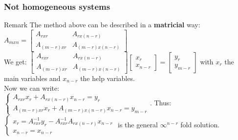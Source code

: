 \begin{frame}
	\frametitle{Not homogeneous systems}
	\begin{block}{Remark}
		The method above can be described in a \textbf{matricial} way:\\
		$A_{mxn}=\begin{bmatrix}
		A_{rxr} & A_{rx(n-r)}\\
		A_{(m-r)xr} & A_{(m-r)x(n-r)}
		\end{bmatrix}$\\
		We get: $\begin{bmatrix}
		A_{rxr} & A_{rx(n-r)}\\
		A_{(m-r)xr} & A_{(m-r)x(n-r)}\end{bmatrix}\begin{bmatrix}
		x_r \\x_{n-r}
		\end{bmatrix}=\begin{bmatrix}
		y_r \\ y_{m-r}
		\end{bmatrix}$ with $x_r$ the main variables and $x_{n-r}$ the help variables.\\
		Now we can write:\\
		$\begin{cases}
		A_{rxr}x_r+A_{rx(n-r)}x_{n-r}=y_r\\
		A_{(m-r)xr}x_r+A_{(m-r)x(n-r)}x_{n-r}=y_{m-r}
		\end{cases}$. Thus:\\
		$\begin{cases}
		x_r=A_{rxr}^{-1}y_r-A_{rxr}^{-1}A_{rx(n-r)}x_{n-r}\\
		x_{n-r}=x_{n-r}
		\end{cases}$ is the general $\infty^{n-r}$ fold solution.
	\end{block}
\end{frame}

